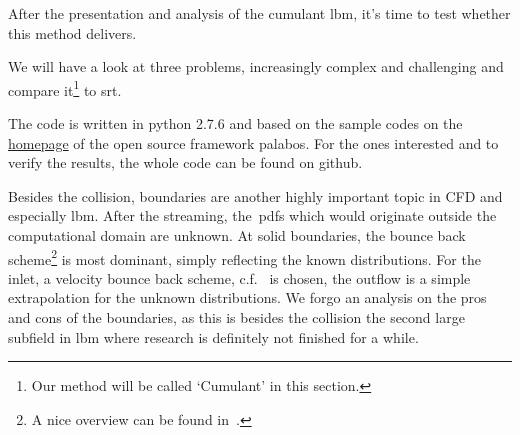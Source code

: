 After the presentation and analysis of the cumulant \gls{lbm}, it's time to test whether this method delivers.

We will have a look at three problems, increasingly complex and challenging and compare it\footnote{Our method will be called `Cumulant' in this section.} to \gls{srt}.

The code is written in python 2.7.6 and based on the sample codes on the \href{http://wiki.palabos.org/numerics:codes}{homepage} of the open source framework palabos.
For the ones interested and to verify the results, the whole code can be found on github.

Besides the collision, boundaries are another highly important topic in CFD and especially \gls{lbm}.
After the streaming, the~\glspl{pdf} which would originate outside the computational domain are unknown.
At solid boundaries, the bounce back scheme\footnote{A nice overview can be found in~\cite{boundaries}.} is most dominant, simply reflecting the known distributions.
For the inlet, a velocity bounce back scheme, c.f.~\cite{yu2003viscous} is chosen, the outflow is a simple extrapolation for the unknown distributions.
We forgo an analysis on the pros and cons of the boundaries, as this is besides the collision the second large subfield in \gls{lbm} where research is definitely not finished for a while.

